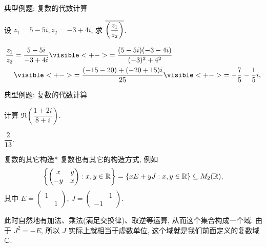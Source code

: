 \begin{frame}{典型例题: 复数的代数计算}
\onslide<+->
\begin{example}
设 $z_1=5-5i,z_2=-3+4i$, 求 $\overline{\left(\dfrac{z_1}{z_2}\right)}$.
\end{example}
\onslide<+->
\begin{solution}
\vspace{-\baselineskip}
\begin{align*}
\frac{z_1}{z_2}&=\frac{5-5i}{-3+4i}
\visible<+->{=\frac{(5-5i)(-3-4i)}{(-3)^2+4^2}}\\
&\visible<+->{=\frac{(-15-20)+(-20+15)i}{25}}
\visible<+->{=-\frac75-\frac15i,}
\end{align*}
\end{solution}
\end{frame}


\begin{frame}{典型例题: 复数的代数计算}
\onslide<+->
\begin{exercise}
计算 $\Re\left(\dfrac{1+2i}{8+i}\right)$.
\end{exercise}
\onslide<+->
\begin{answer}
$\dfrac2{13}$.
\end{answer}
\end{frame}


\begin{frame}{复数的其它构造*}
\onslide<+->复数也有其它的构造方式, 
\onslide<+->例如
	\[{\left\{\begin{pmatrix}
	x&y\\-y&x\end{pmatrix}: x,y\in{\mathbb{R}}\right\}}
	={\left\{xE+yJ: x,y\in{\mathbb{R}}\right\}}\subseteq M_2({\mathbb{R}}),\]
\onslide<+->其中 $E=\begin{pmatrix}1& \\&1\end{pmatrix}$,
	$J=\begin{pmatrix}&1\\-1&\end{pmatrix}$.

\onslide<+->此时自然地有加法、乘法(满足交换律)、取逆等运算, 从而这个集合构成一个域.
\onslide<+->由于 $J^2=-E$, 所以 $J$ 实际上就相当于虚数单位, 这个域就是我们前面定义的复数域 ${\mathbb{C}}$.
\end{frame}


